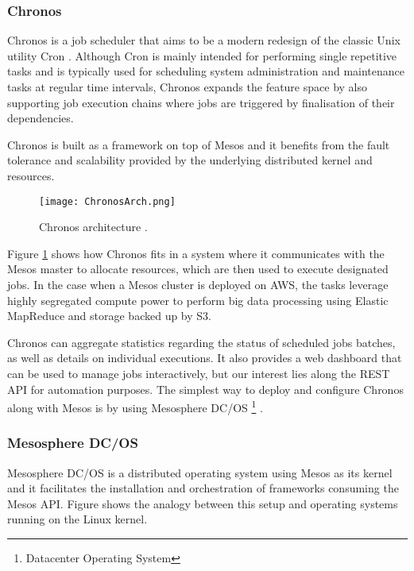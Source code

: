 \subsubsection{Chronos}

Chronos \cite{Chronos} is a job scheduler that aims to be a modern redesign of the classic Unix utility Cron \cite{Cron}. Although Cron is mainly intended for performing single repetitive tasks and is typically used for scheduling system administration and maintenance tasks at regular time intervals, Chronos expands the feature space by also supporting job execution chains where jobs are triggered by finalisation of their dependencies. 

Chronos is built as a framework on top of Mesos and it benefits from the fault tolerance and scalability provided by the underlying distributed kernel and resources.

\begin{figure}[h]
	\centering
		\texttt{[image: ChronosArch.png]}
	\caption{Chronos architecture \cite{ChronosArch}.}
	\label{ChronosArch}
\end{figure}

Figure \ref{ChronosArch} shows how Chronos fits in a system where it communicates with the Mesos master to allocate resources, which are then used to execute designated jobs. In the case when a Mesos cluster is deployed on AWS, the tasks leverage highly segregated compute power to perform big data processing using Elastic MapReduce \cite{EMR} and storage backed up by S3.

Chronos can aggregate statistics regarding the status of scheduled jobs batches, as well as details on individual executions. It also provides a web dashboard that can be used to manage jobs interactively, but our interest lies along the REST API for automation purposes. The simplest way to deploy and configure Chronos along with Mesos is by using Mesosphere DC/OS \footnote{Datacenter Operating System} \cite{DCOS}.

\subsubsection{Mesosphere DC/OS}

Mesosphere DC/OS is a distributed operating system using Mesos as its kernel and it facilitates the installation and orchestration of frameworks consuming the Mesos API. Figure shows the analogy between this setup and operating systems running on the Linux kernel.

